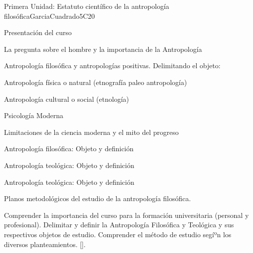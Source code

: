 \begin{syllabus}
\begin{unit}{}{Primera Unidad: Estatuto científico de la antropología filosófica}{GarciaCuadrado}{5}{C20}
\begin{topics}
	\item Presentación del curso
	\item La pregunta sobre el hombre y la importancia de la Antropología
	\item Antropología filosófica y antropologías positivas. Delimitando el objeto: 
	\begin{subtopics}
		\item Antropología física o natural (etnografía  paleo antropología)
		\item Antropología cultural o social (etnología)
		\item Psicología Moderna
		\item Limitaciones de la ciencia moderna y el mito del progreso
		\item Antropología filosófica: Objeto y definición
		\item Antropología teológica: Objeto y definición
		\item Antropología teológica: Objeto y definición	
	\end{subtopics}
	\item Planos metodológicos del estudio de la antropología filosófica. 
\end{topics}

\begin{learningoutcomes}
	\item Comprender la importancia del curso para la formación universitaria (personal y profesional).
Delimitar y definir la Antropología Filosófica y Teológica y sus respectivos objetos de estudio.
Comprender el método de estudio segíºn los diversos planteamientos. [\Usage].

\end{learningoutcomes}
\end{unit}


\end{syllabus}
